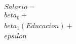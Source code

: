 \documentclass[preview]{standalone}
\begin{document}
\begin{align*}
Salario = \\beta_0 + \\beta_1 (Educacion) + \\epsilon
\end{align*}
\end{document}
